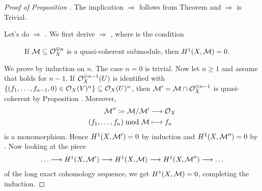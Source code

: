 \documentclass[a4paper,parskip=half,numbers=enddot, DIV=12]{scrreprt}
\begin{document}
\begin{proof}[Proof of Proposition ]
 The implication  $\Rightarrow$  follows from Theorem  and  $\Rightarrow$  is Trivial.

Let's do  $\Rightarrow$ . We first derive  $\Rightarrow$ , where  is the condition
\begin{description}
	\item[] If $\mathcal{M}\subseteq \mathcal{O}_X^{\oplus n}$ is a quasi-coherent submodule, then $H^1(X,\mathcal{M})=0$.
\end{description}
We prove  by induction on $n$. The case $n=0$ is trivial. Now let $n\geq 1$ and assume that  holds for $n-1$. If $\mathcal{O}_X^{\oplus n-1}(U)$ is identified with
$\{(f_1,\ldots,f_{n-1},0) \in \mathcal{O}_X(V)^n\} \subseteq \mathcal{O}_X(U)^n$, then
$\mathcal{M}' = \mathcal{M}\cap \mathcal{O}_X^{\oplus n-1}$ is quasi-coherent by Proposition .
Moreover,
\begin{align*}
	\Mm'' \coloneqq \Mm/\Mm'&\morphism \Oo_X\\
	(f_1,\ldots,f_n)\bmod\Mm&\longmapsto f_n
\end{align*}
is a monomorphism. Hence $H^1(X,\mathcal{M}')=0$ by induction and $H^1(X,\mathcal{M}'')=0$ by . Now looking at the piece
\begin{align*}
\ldots\morphism H^1(X,\Mm')\morphism H^1(X,\Mm)\morphism H^1(X,\Mm'')\morphism\ldots
\end{align*}
of the long exact cohomology sequence, we get $H^1(X,\mathcal{M})=0$, completing the induction.


\end{proof}
\end{document}
